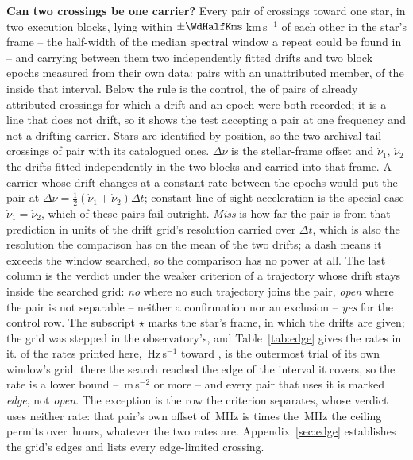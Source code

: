 \begin{table}
\centering
\caption{\textbf{Can two crossings be one carrier?} Every pair of crossings
toward one star, in two execution blocks, lying within
$\pm\WdHalfKms$\,km\,s$^{-1}$ of each other in the star's frame -- the
half-width of the median spectral window a repeat could be found in -- and
carrying between them two independently fitted drifts and two block epochs
measured from their own data: \TjNPair{} pairs with an unattributed member,
of the \TjNCandPair{} inside that interval. Below the rule is the control, the
\TjNCandAttrTest{} of \TjNCandAttr{} pairs of already attributed crossings for
which a drift and an epoch were both recorded; it is a line that does not
drift, so it shows the test accepting a pair at one frequency and not a
drifting carrier. Stars are
identified by position, so the two archival-tail crossings of \TjDeepStar{}
pair with its catalogued ones. $\Delta\nu$ is the stellar-frame offset and
$\dot\nu_1$, $\dot\nu_2$ the drifts fitted independently in the two blocks
and carried into that frame. A carrier whose drift changes at a constant rate
between the epochs would put the pair at
$\Delta\nu=\frac{1}{2}(\dot\nu_1+\dot\nu_2)\Delta t$; constant
line-of-sight acceleration is the special case $\dot\nu_1=\dot\nu_2$, which
\TjNUneqDrift{} of these pairs fail outright. \emph{Miss} is how
far the pair is from that prediction in units of the drift grid's resolution
carried over $\Delta t$, which is also the resolution the comparison has on
the mean of the two drifts; a dash means it exceeds the window searched, so the
comparison has no power at all. The last column is the verdict under the weaker
criterion of a trajectory whose drift stays inside the searched grid:
\emph{no} where no such trajectory joins the pair, \emph{open} where the pair
is not separable -- neither a confirmation nor an exclusion --
\emph{yes} for the control row. The subscript $\star$ marks the star's
frame, in which the drifts are given; the grid was stepped in the
observatory's, and Table~\ref{tab:edge} gives the rates in it. \EgNPairDriftEdge{} of the rates
printed here, \EgStarDriftHzS\,Hz\,s$^{-1}$ toward \EgStarALosHiStar, is the
outermost trial of its own window's grid: there the search reached the edge
of the interval it covers, so the rate is a lower bound --
\EgStarALosHi\,m\,s$^{-2}$ or more -- and every pair that uses it is marked
\emph{edge}, not \emph{open}. The exception is the row the criterion
separates, whose verdict uses neither rate: that pair's own offset of
\EgExclOffMHz\,MHz is \EgExclFac{} times the \EgExclReachMHz\,MHz the
ceiling permits over \EgExclDtH\,hours, whatever the two rates are.
Appendix~\ref{sec:edge} establishes the grid's edges and lists every
edge-limited crossing.}
\label{tab:pairs}
\scriptsize

\end{table}

